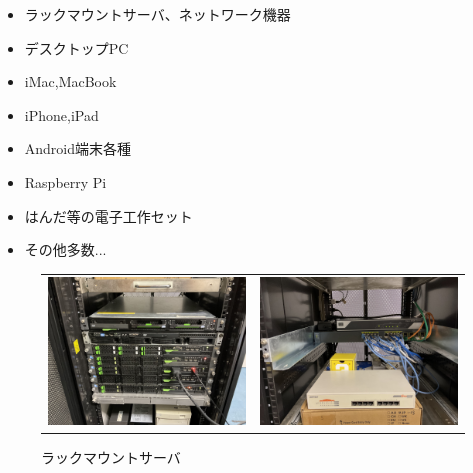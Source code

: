 \begin{tcolorbox}[title=シス研の設備]
  \begin{itemize}
    \item ラックマウントサーバ、ネットワーク機器
    \item デスクトップPC
    \item iMac,MacBook
    \item iPhone,iPad
    \item Android端末各種
    \item Raspberry Pi
    \item はんだ等の電子工作セット
    \item その他多数...
  \end{itemize} 
\end{tcolorbox}

\begin{figure}[H]
  \begin{tabular}{cc}
    \begin{minipage}[b]{0.40\columnwidth}
      \centering
      \includegraphics[width=\columnwidth]{./image/02-AboutSysken/server.jpg}
      \caption{ラックマウントサーバ}
    \end{minipage} &
    \hspace{0.04\columnwidth}
    \begin{minipage}[b]{0.40\columnwidth}
      \centering
      \includegraphics[width=\columnwidth]{./image/02-AboutSysken/network.jpg}

\end{minipage}
\end{tabular}
\end{figure}
